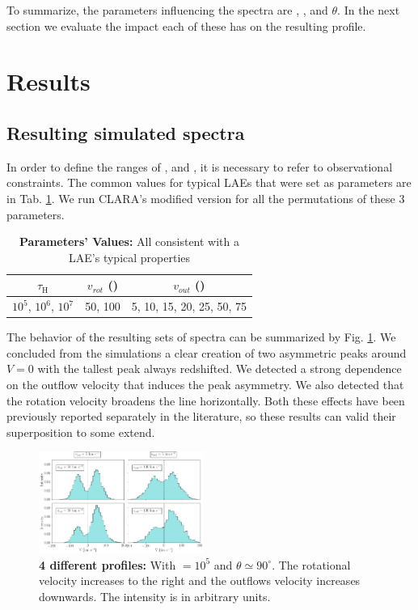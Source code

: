\documentclass[twocolappendix]{latex/emulateapj}
\begin{document}
To summarize, the parameters influencing the spectra are \vrot, \vout, \tauh and $\theta$. In the next section we evaluate the impact each of these has on the resulting profile. \\


\section{Results}
\label{sec:results}

\subsection{Resulting simulated spectra}
In order to define the ranges of \tauh, \vrot and \vout, it is necessary to refer to observational constraints. The common values for typical LAEs that were set as parameters are in Tab. \ref{tab:values}. We run CLARA's modified version for all the permutations of these 3 parameters. \\

\begin{table}[htbp]
	\centering
	\begin{tabular}{|c|c|c|}
		\hline
		$\tau_{\mathrm{H}}$ & $v_{rot}$ (\kms) & $v_{out}$ (\kms) \\
		\hline
		$10^5$, $10^6$, $10^7$ & 50, 100 & 5, 10, 15, 20, 25, 50, 75 \\
		\hline
	\end{tabular}
	\caption{\textbf{Parameters' Values:} All consistent with a LAE's typical properties}
	\label{tab:values}
\end{table}

The behavior of the resulting sets of spectra can be summarized by Fig. \ref{fig:summary}. We concluded from the simulations a clear creation of two asymmetric peaks around $V=0$ \kms with the tallest peak always redshifted. We detected a strong dependence on the outflow velocity that induces the peak asymmetry. We also detected that the rotation velocity broadens the line horizontally. Both these effects have been previously reported separately in the literature, so these results can valid their superposition to some extend. \\

\begin{figure}[h!]
	\begin{center}
		\includegraphics[width=0.48\textwidth]{./figures/summary}
	\end{center}
	\caption{\textbf{4 different \lya profiles:} With \tauh$=10^5$ and $\theta \simeq 90^\circ$. The rotational velocity \vrot increases to the right and the outflows velocity \vout increases downwards. The intensity is in arbitrary units.
		\label{fig:summary}}
\end{figure}
\end{document}
